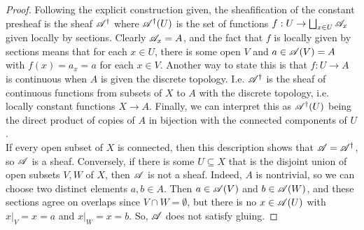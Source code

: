\begin{proof}
	Following the explicit construction given, the sheafification of the constant presheaf is the sheaf $\mathscr{A}^\dagger$ where $\mathscr{A}^\dagger(U)$ is the set of functions $f : U \to \bigsqcup_{x \in U} \mathscr{A}_x$ given locally by sections. Clearly $\mathscr{A}_x = A$, and the fact that $f$ is locally given by sections means that for each $x \in U$, there is some open $V$ and $a \in \mathscr{A}(V) = A$ with $f(x) = a_x = a$ for each $x \in V$. Another way to state this is that $f : U \to A$ is continuous when $A$ is given the discrete topology. I.e. $\mathscr{A}^\dagger$ is the sheaf of continuous functions from subsets of $X$ to $A$ with the discrete topology, i.e. locally constant functions $X \to A$. Finally, we can interpret this as $\mathscr{A}^\dagger(U)$ being the direct product of copies of $A$ in bijection with the connected components of $U$. \\
	
	If every open subset of $X$ is connected, then this description shows that $\mathscr{A} = \mathscr{A}^\dagger$, so $\mathscr{A}$ is a sheaf. Conversely, if there is some $U \subseteq X$ that is the disjoint union of open subsets $V,W$ of $X$, then $\mathscr{A}$ is not a sheaf. Indeed, $A$ is nontrivial, so we can choose two distinct elements $a,b \in A$. Then $a \in \mathscr{A}(V)$ and $b \in \mathscr{A}(W)$, and these sections agree on overlaps since $V \cap W = \emptyset$, but there is no $x \in \mathscr{A}(U)$ with $x|_V = x = a$ and $x|_W = x = b$. So, $\mathscr{A}$ does not satisfy gluing.
\end{proof}
